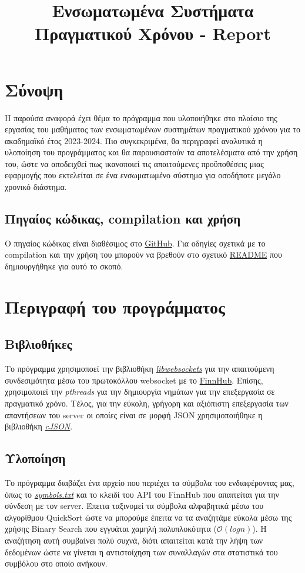 \documentclass[11pt]{article}
\date{}
\title{Ενσωματωμένα Συστήματα Πραγματικού Χρόνου - Report}
\begin{document}
\maketitle
\section{Σύνοψη}
\label{sec:org50bf242}
Η παρούσα αναφορά έχει θέμα το πρόγραμμα που υλοποιήθηκε στο πλαίσιο της εργασίας του μαθήματος των ενσωματωμένων συστημάτων πραγματικού χρόνου για το ακαδημαϊκό έτος 2023-2024. Πιο συγκεκριμένα, θα περιγραφεί αναλυτικά η υλοποίηση του προγράμματος και θα παρουσιαστούν τα αποτελέσματα από την χρήση του, ώστε να αποδειχθεί πως ικανοποιεί τις απαιτούμενες προϋποθέσεις μιας εφαρμογής που εκτελείται σε ένα ενσωματωμένο σύστημα για οσοδήποτε μεγάλο χρονικό διάστημα.
\subsection{Πηγαίος κώδικας, compilation και χρήση}
\label{sec:orgfe7139a}
Ο πηγαίος κώδικας είναι διαθέσιμος στο \href{https://github.com/thetonk/tradestats}{GitHub}. Για οδηγίες σχετικά με το compilation και την χρήση του μπορούν να βρεθούν στο σχετικό \href{https://github.com/thetonk/tradestats/blob/main/README.md}{README} που δημιουργήθηκε για αυτό το σκοπό.
\section{Περιγραφή του προγράμματος}
\label{sec:orgc8fecf4}
\subsection{Βιβλιοθήκες}
\label{sec:org695b1ca}
Το πρόγραμμα χρησιμοποεί την βιβλιοθήκη \href{https://libwebsockets.org/}{\emph{libwebsockets}} για την απαιτούμενη συνδεσιμότητα μέσω του πρωτοκόλλου websocket με το \href{https://finnhub.io}{FinnHub}. Επίσης, χρησιμοποιεί την \emph{pthreads} για την δημιουργία νημάτων για την επεξεργασία σε πραγματικό χρόνο. Τέλος, για την εύκολη, γρήγορη και αξιόπιστη επεξεργασία των απαντήσεων του server οι οποίες είναι σε μορφή JSON\autocite{sites:finnhub-api} χρησιμοποιήθηκε η βιβλιοθήκη \href{https://github.com/DaveGamble/cJSON}{\emph{cJSON}}.
\subsection{Υλοποίηση}
\label{sec:org1ced589}
Το πρόγραμμα διαβάζει ένα αρχείο που περιέχει τα σύμβολα του ενδιαφέροντας μας, όπως το \emph{\href{https://github.com/thetonk/tradestats/blob/main/symbols.txt}{symbols.txt}} και το κλειδί του API του FinnHub που απαιτείται για την σύνδεση με τον server. Έπειτα ταξινομεί τα σύμβολα αλφαβητικά μέσω του αλγορίθμου QuickSort\autocite{enwiki:1241885213} ώστε να μπορούμε έπειτα να τα αναζητάμε εύκολα μέσω της χρήσης Binary Search που εγγυάται χαμηλή πολυπλοκότητα (\(\mathcal{O}(logn)\))\autocite{enwiki:1242941867}. Η αναζήτηση αυτή συμβαίνει πολύ συχνά, διότι απαιτείται κατά την λήψη των δεδομένων ώστε να γίνεται η αντιστοίχηση των συναλλαγών στα στατιστικά του συμβόλου στο οποίο ανήκουν.\\
\end{document}
